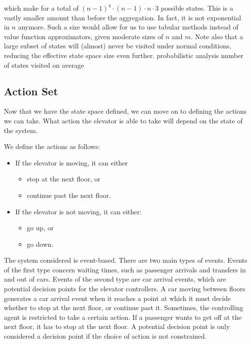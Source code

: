 which make for a total of $(n-1)^4 \cdot (n - 1) \cdot n \cdot 3$ possible states. This is a vastly smaller amount than before the aggregation. In fact, it is not exponential in $n$ anymore. Such a size would allow for us to use tabular methods instead of value function approximators, given moderate sizes of $n$ and $m$. Note also that a large subset of states will (almost) never be visited under normal conditions, reducing the effective state space size even further. {\color{red} probabilistic analysis number of states visited on average}



\subsection{Action Set}

Now that we have the state space defined, we can move on to defining the actions we can take. What action the elevator is able to take will depend on the state of the system.

We define the actions as follows:

\begin{itemize}
    \item If the elevator is moving, it can either
        \begin{itemize}
            \item stop at the next floor, or
            \item continue past the next floor.
        \end{itemize}

    \item If the elevator is not moving, it can either:
        \begin{itemize}
            \item go up, or
            \item go down.
        \end{itemize}
\end{itemize}

The system considered is event-based. There are two main types of events. Events of the first type concern waiting times, such as passenger arrivals and transfers in and out of cars. Events of the second type are car arrival events, which are potential decision points for the elevator controllers. A car moving between floors generates a car arrival event when it reaches a point at which it must decide whether to stop at the next floor, or continue past it. Sometimes, the controlling agent is restricted to take a certain action. If a passenger wants to get off at the next floor, it has to stop at the next floor. A potential decision point is only considered a decision point if the choice of action is not constrained.

